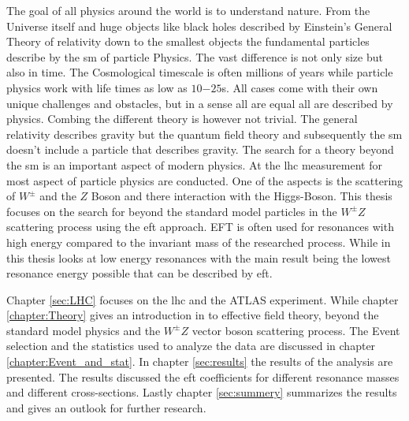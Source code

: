 \documentclass[../Bachelorarbeit.tex]{subfiles}
\begin{document}
The goal of all physics around the world is to understand nature. From the Universe itself and huge objects like black holes described by Einstein's General Theory of relativity down to the smallest objects the fundamental particles describe by the \acrfull{sm} of particle Physics.
The vast difference is not only size but also in time. The Cosmological timescale is often millions of years while particle physics work with life times as low as $10{-25}$s.
All cases come with their own unique challenges and obstacles, but in a sense all are equal all are described by physics. Combing the different theory is however not trivial.
The general relativity describes gravity but the quantum field theory and subsequently the \acrshort{sm} doesn't include a particle that describes gravity. The search for a theory beyond the \acrshort{sm} is an important aspect of modern physics.
At the \acrfull{lhc} measurement for most aspect of particle physics are conducted. One of the aspects is the scattering of $W^{\pm }$ and the $Z$ Boson and there interaction with the Higgs-Boson.
This thesis focuses on the search for beyond the standard model particles in the $W^{\pm}Z$ scattering process using the \acrfull{eft} approach.
EFT is often used for resonances with high energy compared to the invariant mass of the researched process. While in this thesis looks at low energy resonances with the main result being the lowest resonance energy possible that can be described by \acrshort{eft}.

Chapter \ref{sec:LHC} focuses on the \acrfull{lhc} and the ATLAS experiment.
While chapter \ref{chapter:Theory} gives an introduction in to effective field theory, beyond the standard model physics and the $W^{\pm}Z$ vector boson scattering process. The Event selection and the statistics used to analyze the data are discussed in chapter \ref{chapter:Event_and_stat}.
In chapter \ref{sec:results} the results of the analysis are presented. The results discussed the \acrshort{eft} coefficients for different resonance masses and different cross-sections.
Lastly chapter \ref{sec:summery} summarizes the results and gives an outlook for further research.
\end{document}
